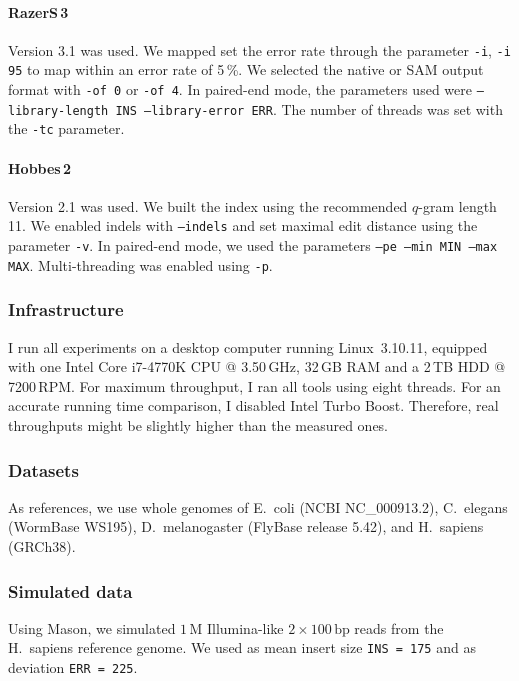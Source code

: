 \paragraph{RazerS\,3}
Version 3.1 was used.
We mapped set the error rate through the parameter \texttt{-i}, \eg \texttt{-i 95} to map within an error rate of 5\,\%.
We selected the native or SAM output format with \texttt{-of 0} or \texttt{-of 4}.
In paired-end mode, the parameters used were \texttt{--library-length INS --library-error ERR}.
The number of threads was set with the \texttt{-tc} parameter.

\paragraph{Hobbes\,2}
Version 2.1 was used.
We built the index using the recommended $q$-gram length 11.
We enabled indels with \texttt{--indels} and set maximal edit distance using the parameter \texttt{-v}.
In paired-end mode, we used the parameters \texttt{--pe --min MIN --max MAX}.
Multi-threading was enabled using \texttt{-p}.

\subsubsection{Infrastructure}

I run all experiments on a desktop computer running Linux~3.10.11, equipped with one Intel Core i7-4770K CPU @ 3.50\,GHz, 32\,GB RAM and a 2\,TB HDD @ 7200\,RPM.
For maximum throughput, I ran all tools using eight threads.
For an accurate running time comparison, I disabled Intel Turbo Boost.
Therefore, real throughputs might be slightly higher than the measured ones.

\subsubsection{Datasets}

As references, we use whole genomes of E.~coli (NCBI NC\_000913.2), C.~elegans (WormBase WS195), D.~melanogaster (FlyBase release 5.42), and H.~sapiens (GRCh38).

\subsubsection{Simulated data}
Using Mason, we simulated $1\,\text{M}$ Illumina-like $2 \times 100\,\text{bp}$ reads from the H.~sapiens reference genome.
We used as mean insert size \texttt{INS = 175} and as deviation \texttt{ERR = 225}.

